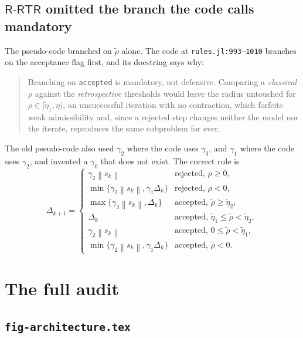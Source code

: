\documentclass[11pt,a4paper]{article}
\providecommand{\norm}[1]{\left \lVert #1 \right \rVert}
\providecommand{\Rrtr}{\textsf{R-RTR}}
\begin{document}
\subsection{\texorpdfstring{$\Rrtr$}{R-RTR} omitted the branch the code calls
mandatory}

The pseudo-code branched on $\widetilde\rho$ alone. The code at
\texttt{rules.jl:993--1010} branches on the acceptance flag first, and its
docstring says why:

\begin{quote}\small
Branching on \texttt{accepted} is mandatory, not defensive. Comparing a
\emph{classical} $\rho$ against the \emph{retrospective} thresholds would leave
the radius untouched for $\rho \in [\widetilde\eta_1, \eta)$, an unsuccessful
iteration with no contraction, which forfeits weak admissibility and, since a
rejected step changes neither the model nor the iterate, reproduces the same
subproblem for ever.
\end{quote}

The old pseudo-code also used $\gamma_2$ where the code uses $\gamma_3$, and
$\gamma_1$ where the code uses $\gamma_2$, and invented a $\gamma_0$ that does
not exist. The correct rule is
\[
  \Delta_{k+1} =
  \begin{cases}
    \gamma_2\norm{s_k}                       & \text{rejected, } \rho \ge 0,\\
    \min\{\gamma_2\norm{s_k}, \gamma_1\Delta_k\} & \text{rejected, } \rho < 0,\\
    \max\{\gamma_3\norm{s_k}, \Delta_k\}     & \text{accepted, } \widetilde\rho \ge \widetilde\eta_2,\\
    \Delta_k                                 & \text{accepted, } \widetilde\eta_1 \le \widetilde\rho < \widetilde\eta_2,\\
    \gamma_2\norm{s_k}                       & \text{accepted, } 0 \le \widetilde\rho < \widetilde\eta_1,\\
    \min\{\gamma_2\norm{s_k}, \gamma_1\Delta_k\} & \text{accepted, } \widetilde\rho < 0.
  \end{cases}
\]

\section{The full audit}\label{sec: full}

\subsection{\texttt{fig-architecture.tex}}
\end{document}
